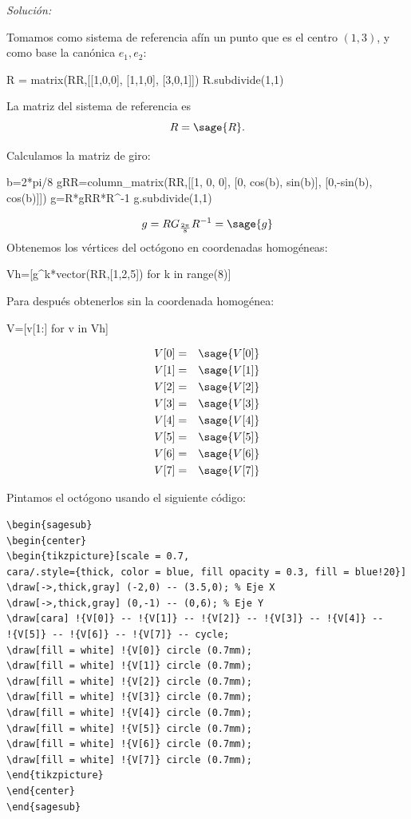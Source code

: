 \documentclass{amsart}
\begin{document}
{\it Solución:}


Tomamos como sistema de referencia afín un punto que es el centro $(1,3)$, y como base la canónica $e_1,e_2$:

\begin{sageblock}
R = matrix(RR,[[1,0,0],
              [1,1,0],
              [3,0,1]])
R.subdivide(1,1)
\end{sageblock}

La matriz del sistema de referencia es \[R=\sage{R}.\]


Calculamos la matriz de giro:
\begin{sageblock}
b=2*pi/8
gRR=column_matrix(RR,[[1, 0,      0],
                      [0, cos(b), sin(b)],
                      [0,-sin(b), cos(b)]])
g=R*gRR*R^-1
g.subdivide(1,1)
\end{sageblock}
$$g=RG_{\frac{2\pi}{8}}R^{-1}=\sage{g}$$
Obtenemos los vértices del octógono en coordenadas homogéneas:
\begin{sageblock}
Vh=[g^k*vector(RR,[1,2,5]) for k in range(8)]
\end{sageblock}
Para después obtenerlos sin la coordenada homogénea:
\begin{sageblock}
V=[v[1:] for v in Vh]
\end{sageblock}
\begin{eqnarray*}
V[0] &=& \sage{V[0]}\\
V[1] &=& \sage{V[1]}\\
V[2] &=& \sage{V[2]}\\
V[3] &=& \sage{V[3]}\\
V[4] &=& \sage{V[4]}\\
V[5] &=& \sage{V[5]}\\
V[6] &=& \sage{V[6]}\\
V[7] &=& \sage{V[7]}
\end{eqnarray*}

Pintamos el octógono usando el siguiente código:

\begin{verbatim}
\begin{sagesub}
\begin{center}
\begin{tikzpicture}[scale = 0.7,
cara/.style={thick, color = blue, fill opacity = 0.3, fill = blue!20}]
\draw[->,thick,gray] (-2,0) -- (3.5,0); % Eje X
\draw[->,thick,gray] (0,-1) -- (0,6); % Eje Y
\draw[cara] !{V[0]} -- !{V[1]} -- !{V[2]} -- !{V[3]} -- !{V[4]} -- 
!{V[5]} -- !{V[6]} -- !{V[7]} -- cycle;
\draw[fill = white] !{V[0]} circle (0.7mm); 
\draw[fill = white] !{V[1]} circle (0.7mm); 
\draw[fill = white] !{V[2]} circle (0.7mm); 
\draw[fill = white] !{V[3]} circle (0.7mm); 
\draw[fill = white] !{V[4]} circle (0.7mm); 
\draw[fill = white] !{V[5]} circle (0.7mm); 
\draw[fill = white] !{V[6]} circle (0.7mm); 
\draw[fill = white] !{V[7]} circle (0.7mm); 
\end{tikzpicture}
\end{center}
\end{sagesub}
\end{verbatim}
\end{document}
